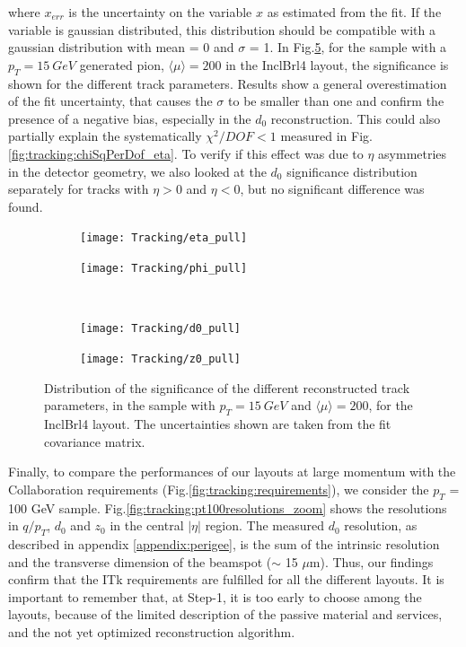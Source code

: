 \documentclass[a4paper,twoside,12pt]{book}
\begin{document}
where $x_{err}$ is the uncertainty on the variable $x$ as estimated from the fit. If the variable is gaussian distributed, this distribution should be compatible with
a gaussian distribution with mean = 0 and $\sigma$ = 1. In Fig.\ref{fig:tracking:pull}, for the sample with a $p_{T} = 15\ GeV$ generated pion, $\langle\mu\rangle = 200$ in the InclBrl4 layout, the significance is shown for the different
track parameters. Results show a general overestimation of the fit uncertainty, that causes the $\sigma$ to be smaller than one and confirm the presence of 
a negative bias, especially in the $d_{0}$ reconstruction. This could also partially explain the systematically $\chi^2/DOF < 1$ measured in
Fig.\ref{fig:tracking:chiSqPerDof_eta}. To verify if this effect was due to $\eta$ asymmetries in the detector geometry, 
we also looked at the $d_{0}$ significance distribution separately for tracks with $\eta > 0$ and $\eta < 0$, but no significant difference was found. \\

\begin{figure}
\begin{subfigure}{.5\linewidth}
\texttt{[image: Tracking/eta\_pull]}
\caption{}
\label{fig:tracking:eta_pull}
\end{subfigure}
\begin{subfigure}{.5\linewidth}
\texttt{[image: Tracking/phi\_pull]}
\caption{}
\label{fig:tracking:phi_pull}
\end{subfigure}\\[1ex]
\begin{subfigure}{.5\linewidth}
\texttt{[image: Tracking/d0\_pull]}
\caption{}
\label{fig:tracking:d0_pull}
\end{subfigure}
\begin{subfigure}{.5\linewidth}
\texttt{[image: Tracking/z0\_pull]}
\caption{}
\label{fig:tracking:z0_pull}
\end{subfigure}

\caption{Distribution of the significance of the different reconstructed track parameters, in the sample with $p_{T} = 15\ GeV$ and $\langle\mu\rangle = 200$, for the InclBrl4 layout. The
uncertainties shown are taken from the fit covariance matrix.}
\label{fig:tracking:pull}
\end{figure}

Finally, to compare the performances of our layouts at large momentum with the Collaboration requirements (Fig.\ref{fig:tracking:requirements}), we consider the $p_{T}$ = 100 GeV sample.
Fig.\ref{fig:tracking:pt100resolutions_zoom} shows the resolutions in $q/p_{T}$, $d_{0}$ and $z_{0}$ in the central
$|\eta|$ region. The measured $d_{0}$ resolution, as described in appendix \ref{appendix:perigee}, is the sum of the intrinsic resolution and the transverse dimension of the beamspot ($\sim$ 15 $\mu$m). Thus, our findings confirm that the ITk requirements are fulfilled for all the different layouts. It is important to remember that, at Step-1, it is too early to choose among the
layouts, because of the limited description of the passive material and services, and the not yet optimized reconstruction algorithm. \\
\end{document}
